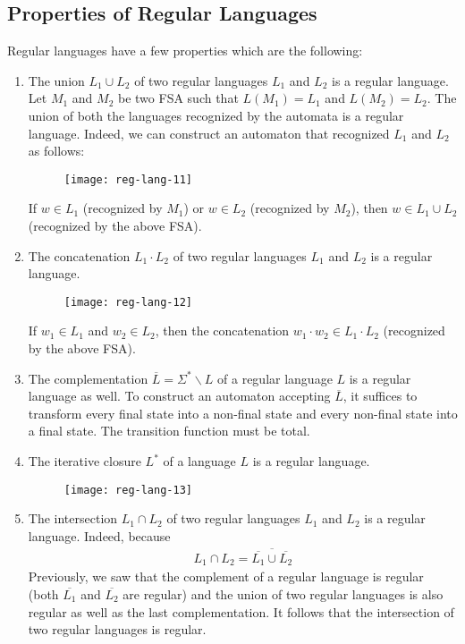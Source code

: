\subsection{Properties of Regular Languages}
Regular languages have a few properties which are the following:
\begin{enumerate}
  \item The union $L_1 \cup L_2$ of two regular languages $L_1$ and $L_2$ is a regular language.
        Let $M_1$ and $M_2$ be two FSA such that $L(M_1) = L_1$ and $L(M_2) = L_2$.
        The union of both the languages recognized by the automata is a regular language.
        Indeed, we can construct an automaton that recognized $L_1$ and $L_2$ as follows:
        \begin{figure}[H]
          \centering
          \texttt{[image: reg-lang-11]}
        \end{figure}
        If $w \in L_1$ (recognized by $M_1$) or $w \in L_2$ (recognized by $M_2$), then
        $w \in L_1 \cup L_2$ (recognized by the above FSA).
  \item The concatenation $L_1 \cdot L_2$ of two regular languages $L_1$ and $L_2$ is a regular language.
        \begin{figure}[H]
          \centering
          \texttt{[image: reg-lang-12]}
        \end{figure}
        If $w_1 \in L_1$ and $w_2 \in L_2$, then the concatenation $w_1 \cdot w_2 \in L_1 \cdot L_2$
        (recognized by the above FSA).
  \item The complementation $\overline{L} = \Sigma^{*} \backslash L$ of a regular language $L$ is a regular language as well.
        To construct an automaton accepting $\overline{L}$, it suffices to transform every final state into 
        a non-final state and every non-final state into a final state. The transition function must be total.
  \item The iterative closure $L^{*}$ of a language $L$ is a regular language.
        \begin{figure}[H]
          \centering
          \texttt{[image: reg-lang-13]}
        \end{figure}
  \item The intersection $L_1 \cap L_2$ of two regular languages $L_1$ and $L_2$ is a regular language.
        Indeed, because
        \begin{align*}
          L_1 \cap L_2 = \overline{\overline{L_1} \cup \overline{L_2}}
        \end{align*}
        Previously, we saw that the complement of a regular language is regular (both $\overline{L_1}$ and $\overline{L_2}$ are regular)
        and the union of two regular languages is also regular as well as the last complementation. It follows that the intersection of two
        regular languages is regular.
\end{enumerate}
